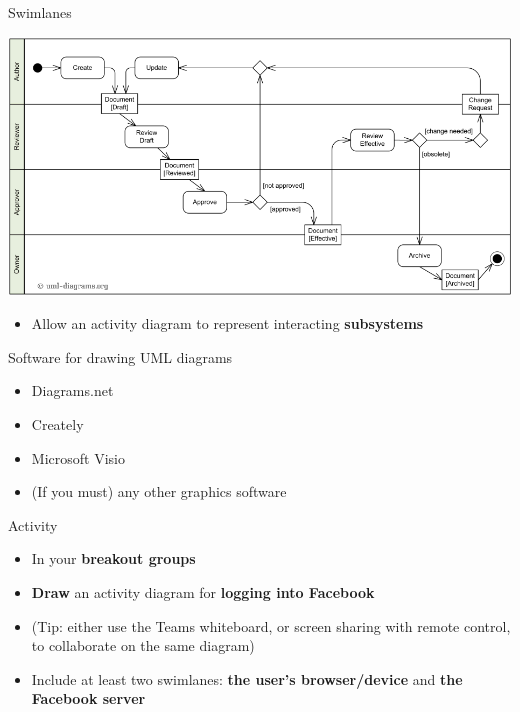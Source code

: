 \begin{frame}{Swimlanes}
	\begin{center}
		\includegraphics[width=\textwidth]{activity-example-document-management}
	\end{center}
	\begin{itemize}
		\item Allow an activity diagram to represent interacting \textbf{subsystems}
	\end{itemize}
\end{frame}

\begin{frame}{Software for drawing UML diagrams}
	\begin{itemize}
		\item Diagrams.net
		\item Creately
		\item Microsoft Visio
		\item (If you must) any other graphics software
	\end{itemize}
\end{frame}

\begin{frame}{Activity}
	\begin{itemize}
		\item In your \textbf{breakout groups}
		\item \textbf{Draw} an activity diagram for \textbf{logging into Facebook}
		\item (Tip: either use the Teams whiteboard, or screen sharing with remote control, to collaborate on the same diagram)
		\item Include at least two swimlanes: \textbf{the user's browser/device} and \textbf{the Facebook server}
	\end{itemize}
\end{frame}
